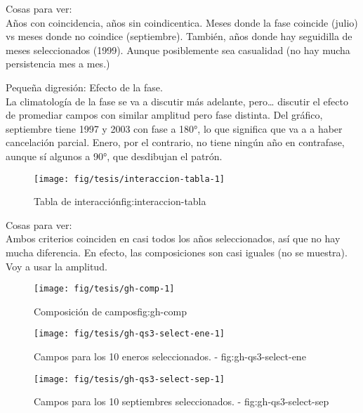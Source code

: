 \documentclass[spanish,a4paper]{book}
\begin{document}
Cosas para ver:\\
Años con coincidencia, años sin coindicentica. Meses donde la fase
coincide (julio) vs meses donde no coindice (septiembre). También, años
donde hay seguidilla de meses seleccionados (1999). Aunque posiblemente
sea casualidad (no hay mucha persistencia mes a mes.)

Pequeña digresión: Efecto de la fase.\\
La climatología de la fase se va a discutir más adelante, pero\ldots{}
discutir el efecto de promediar campos con similar amplitud pero fase
distinta. Del gráfico, septiembre tiene 1997 y 2003 con fase a 180°, lo
que significa que va a a haber cancelación parcial. Enero, por el
contrario, no tiene ningún año en contrafase, aunque sí algunos a 90°,
que desdibujan el patrón.

\begin{figure}

{\centering \texttt{[image: fig/tesis/interaccion-tabla-1]} 

}

\caption{Tabla de interacción{fig:interaccion-tabla}}\label{fig:interaccion-tabla}
\end{figure}

Cosas para ver:\\
Ambos criterios coinciden en casi todos los años seleccionados, así que
no hay mucha diferencia. En efecto, las composiciones son casi iguales
(no se muestra). Voy a usar la amplitud.

\begin{figure}

{\centering \texttt{[image: fig/tesis/gh-comp-1]} 

}

\caption{Composición de campos{fig:gh-comp}}\label{fig:gh-comp}
\end{figure}

\begin{figure}

{\centering \texttt{[image: fig/tesis/gh-qs3-select-ene-1]} 

}

\caption{Campos para los 10 eneros seleccionados. - fig:gh-qs3-select-ene}\label{fig:gh-qs3-select-ene}
\end{figure}

\begin{figure}

{\centering \texttt{[image: fig/tesis/gh-qs3-select-sep-1]} 

}

\caption{Campos para los 10 septiembres seleccionados. - fig:gh-qs3-select-sep}\label{fig:gh-qs3-select-sep}
\end{figure}
\end{document}
